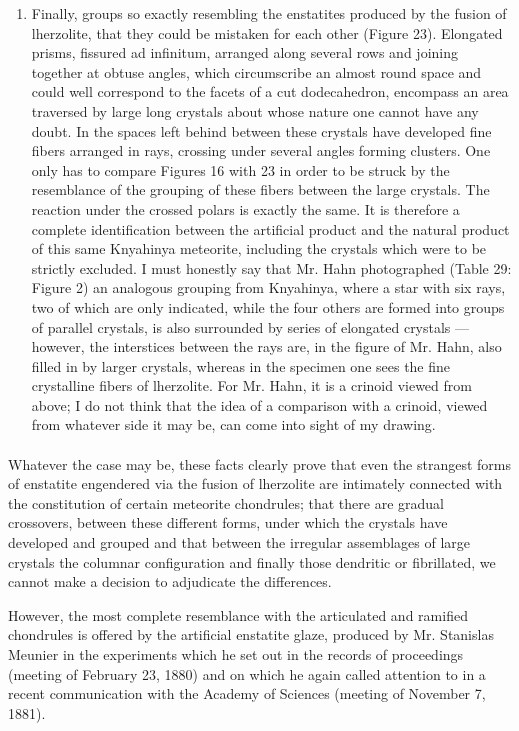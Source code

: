 \documentclass[a4paper, 12pt, oneside]{article}
\begin{document}
\begin{enumerate}
\item Finally, groups so exactly resembling the enstatites produced by the fusion of lherzolite, that they could be mistaken for each other (Figure 23). Elongated prisms, fissured ad infinitum, arranged along several rows and joining together at obtuse angles, which circumscribe an almost round space and could well correspond to the facets of a cut dodecahedron, encompass an area traversed by large long crystals about whose nature one cannot have any doubt. In the spaces left behind between these crystals have developed fine fibers arranged in rays, crossing under several angles forming clusters. One only has to compare Figures 16 with 23 in order to be struck by the resemblance of the grouping of these fibers between the large crystals. The reaction under the crossed polars is exactly the same. It is therefore a complete identification between the artificial product and the natural product of this same Knyahinya meteorite, including the crystals which were to be strictly excluded. I must honestly say that Mr. Hahn photographed (Table 29: Figure 2) an analogous grouping from Knyahinya, where a star with six rays, two of which are only indicated, while the four others are formed into groups of parallel crystals, is also surrounded by series of elongated crystals --- however, the interstices between the rays are, in the figure of Mr. Hahn, also filled in by larger crystals, whereas in the specimen one sees the fine crystalline fibers of lherzolite. For Mr. Hahn, it is a crinoid viewed from above; I do not think that the idea of a comparison with a crinoid, viewed from whatever side it may be, can come into sight of my drawing.
\end{enumerate}
\paragraph*{}
Whatever the case may be, these facts clearly prove that even the strangest forms of enstatite engendered via the fusion of lherzolite are intimately connected with the constitution of certain meteorite chondrules; that there are gradual crossovers, between these different forms, under which the crystals have developed and grouped and that between the irregular assemblages of large crystals the columnar configuration and finally those dendritic or fibrillated, we cannot make a decision to adjudicate the differences.

However, the most complete resemblance with the articulated and ramified chondrules is offered by the artificial enstatite glaze, produced by Mr. Stanislas Meunier in the experiments which he set out in the records of proceedings (meeting of February 23, 1880) and on which he again called attention to in a recent communication with the Academy of Sciences (meeting of November 7, 1881).
\end{document}
